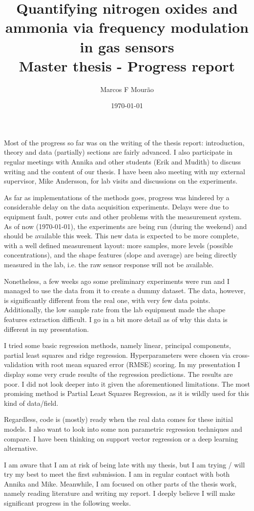 \documentclass{article}
\title{Quantifying nitrogen oxides and ammonia via frequency modulation in gas sensors\\
\small Master thesis - Progress report}
\author{Marcos F Mourão}
\date{\today}
\begin{document}
	\maketitle
	
	Most of the progress so far was on the writing of the thesis report: introduction, theory and data (partially) sections are fairly advanced. I also participate in regular meetings with Annika and other students (Erik and Mudith) to discuss writing and the content of our thesis. I have been also meeting with my external supervisor, Mike Andersson, for lab visits and discussions on the experiments.
		
	As far as implementations of the methods goes, progress was hindered by a considerable delay on the data acquisition experiments. Delays were due to equipment fault, power cuts and other problems with the measurement system. As of now (\today), the experiments are being run (during the weekend) and should be available this week. This new data is expected to be more complete, with a well defined measurement layout: more samples, more levels (possible concentrations), and the shape features (slope and average) are being directly measured in the lab, i.e. the raw sensor response will not be available.
		
	Nonetheless, a few weeks ago some preliminary experiments were run and I managed to use the data from it to create a dummy dataset. The data, however, is significantly different from the real one, with very few data points. Additionally, the low sample rate from the lab equipment made the shape features extraction difficult. I go in a bit more detail as of why this data is different in my presentation. 
	
	I tried some basic regression methods, namely linear, principal components, partial least squares and ridge regression. Hyperparameters were chosen via cross-validation with root mean squared error (RMSE) scoring. In my presentation I display some very crude results of the regression predictions. The results are poor. I did not look deeper into it given the aforementioned limitations. The most promising method is Partial Least Squares Regression, as it is wildly used for this kind of data/field.
	
	Regardless, code is (mostly) ready when the real data comes for these initial models. I also want to look into some non parametric regression techniques and compare. I have been thinking on support vector regression or a deep learning alternative.
	
	I am aware that I am at risk of being late with my thesis, but I am trying / will try my best to meet the first submission. I am in regular contact with both Annika and Mike. Meanwhile, I am focused on other parts of the thesis work, namely reading literature and writing my report. I deeply believe I will make significant progress in the following weeks.
	
\end{document}
